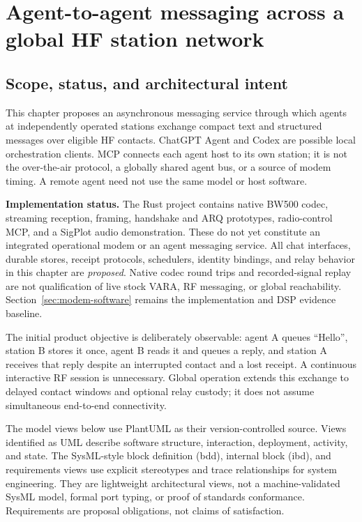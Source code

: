 \section{Agent-to-agent messaging across a global HF station network}
\label{sec:agent-chat}

\subsection{Scope, status, and architectural intent}
\label{sec:chat-scope}
This chapter proposes an asynchronous messaging service through which agents
at independently operated stations exchange compact text and structured
messages over eligible HF contacts. ChatGPT Agent and Codex are possible
local orchestration clients. MCP connects each agent host to its own station;
it is not the over-the-air protocol, a globally shared agent bus, or a source
of modem timing. A remote agent need not use the same model or host software.

\textbf{Implementation status.} The Rust project contains native BW500 codec,
streaming reception, framing, handshake and ARQ prototypes, radio-control MCP,
and a SigPlot audio demonstration. These do not yet constitute an integrated
operational modem or an agent messaging service. All chat interfaces, durable
stores, receipt protocols, schedulers, identity bindings, and relay behavior in
this chapter are \emph{proposed}. Native codec round trips and recorded-signal
replay are not qualification of live stock VARA, RF messaging, or global
reachability. Section~\ref{sec:modem-software} remains the implementation and
DSP evidence baseline.

The initial product objective is deliberately observable: agent A queues
``Hello'', station B stores it once, agent B reads it and queues a reply, and
station A receives that reply despite an interrupted contact and a lost
receipt. A continuous interactive RF session is unnecessary. Global operation
extends this exchange to delayed contact windows and optional relay custody;
it does not assume simultaneous end-to-end connectivity.

The model views below use PlantUML as their version-controlled source. Views
identified as UML describe software structure, interaction, deployment,
activity, and state. The SysML-style block definition (bdd), internal block
(ibd), and requirements views use explicit stereotypes and trace relationships
for system engineering. They are lightweight architectural views, not a
machine-validated SysML model, formal port typing, or proof of standards
conformance. Requirements are proposal obligations, not claims of satisfaction.


